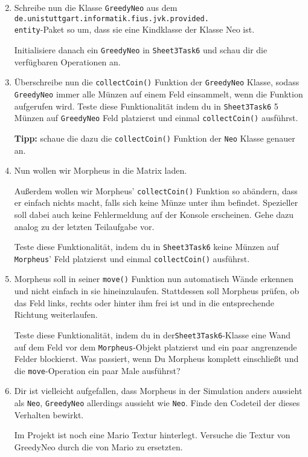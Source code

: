\begin{enumerate}\setcounter{enumi}{1}
\item Schreibe nun die Klasse \lstinline{GreedyNeo} aus dem \texttt{de.unistuttgart.informatik.fius.jvk.provided.}\\\texttt{entity}-Paket so um, dass sie eine Kindklasse der Klasse Neo ist.

Initialisiere danach ein \lstinline{GreedyNeo} in \lstinline{Sheet3Task6} und schau dir die verfügbaren Operationen an.

\item Überschreibe nun die \lstinline{collectCoin()} Funktion der \lstinline{GreedyNeo} Klasse, sodass \lstinline{GreedyNeo} immer alle Münzen auf einem Feld einsammelt, wenn die Funktion aufgerufen wird.
Teste diese Funktionalität indem du in \lstinline{Sheet3Task6} 5 Münzen auf \lstinline{GreedyNeo} Feld platzierst und einmal \lstinline{collectCoin()} ausführst.

\textbf{Tipp:} schaue die dazu die \lstinline{collectCoin()} Funktion der \lstinline{Neo} Klasse genauer an.

\item Nun wollen wir Morpheus in die Matrix laden.

Außerdem wollen wir Morpheus' \lstinline{collectCoin()} Funktion so abändern, dass er einfach nichts macht, falls sich keine Münze unter ihm befindet.
Spezieller soll dabei auch keine Fehlermeldung auf der Konsole erscheinen.
Gehe dazu analog zu der letzten Teilaufgabe vor.

Teste diese Funktionalität, indem du in \lstinline{Sheet3Task6} keine Münzen auf \lstinline{Morpheus}' Feld platzierst und einmal \lstinline{collectCoin()} ausführst.

\item Morpheus soll in seiner \lstinline{move()} Funktion nun automatisch Wände erkennen und nicht einfach in sie hineinzulaufen.
Stattdessen soll Morpheus prüfen, ob das Feld links, rechts oder hinter ihm frei ist und in die entsprechende Richtung weiterlaufen.

Teste diese Funktionalität, indem du in der\lstinline{Sheet3Task6}-Klasse eine Wand auf dem Feld vor dem \lstinline{Morpheus}-Objekt platzierst und ein paar angrenzende Felder blockierst.
Was passiert, wenn Du Morpheus komplett einschließt und die \lstinline{move}-Operation ein paar Male ausführst?

\item \optional Dir ist vielleicht aufgefallen, dass Morpheus in der Simulation anders aussieht als \lstinline{Neo}, \lstinline{GreedyNeo} allerdings aussieht wie \lstinline{Neo}.
Finde den Codeteil der dieses Verhalten bewirkt.

Im Projekt ist noch eine Mario Textur hinterlegt.
Versuche die Textur von GreedyNeo durch die von Mario zu ersetzten.

\end{enumerate}
